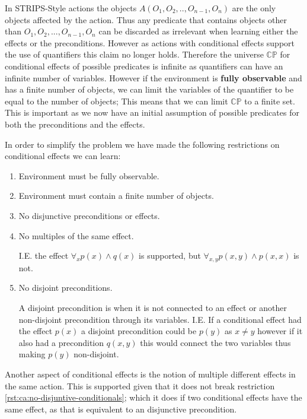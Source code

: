 \documentclass[../Master.tex]{subfiles}
\begin{document}
In STRIPS-Style actions the objects $A(O_1,O_2,..,O_{n-1},O_n)$ are the only objects affected by the action.
Thus any predicate that contains objects other than $O_1,O_2,...,O_{n-1},O_n$ can be discarded as irrelevant when learning either the effects or the preconditions.
However as actions with conditional effects support the use of quantifiers this claim no longer holds.
Therefore the universe $\mathbb{CP}$ for conditional effects of possible predicates is infinite as quantifiers can have an infinite number of variables.
However if the environment is \textbf{fully observable} and has a finite number of objects,
we can limit the variables of the quantifier to be equal to the number of objects; This means that we can limit $\mathbb{CP}$ to a finite set.
This is important as we now have an initial assumption of possible predicates for both the preconditions and the effects.

In order to simplify the problem we have made the following restrictions on conditional effects we can learn:
\begin{enumerate}
	\item Environment must be fully observable.
	\item Environment must contain a finite number of objects.
	\item \label{rst:ca:no-disjuntive-conditionals} No disjunctive preconditions or effects.
	\item \label{rst:ca:no-multiple-effect} No multiples of the same effect.

		  I.E. the effect $\forall_x p(x) \land q(x)$ is supported, but $\forall_{x, y} p(x, y) \land p(x, x) $ is not.

	\item \label{rst:ca:no-disjoint-preconditions} No disjoint preconditions.

		  A disjoint precondition is when it is not connected to an effect or another non-disjoint precondition through its variables.
		  I.E. If a conditional effect had the effect $p(x)$ a disjoint precondition could be $p(y)$ as $x \neq y$ however if it also had a precondition $q(x,y)$ this would connect the two variables thus making $p(y)$ non-disjoint.
\end{enumerate}

Another aspect of conditional effects is the notion of multiple different effects in the same action. This is supported given that it does not break restriction \ref{rst:ca:no-disjuntive-conditionals}; which it does if two conditional effects have the same effect, as that is equivalent to an disjunctive precondition.
\end{document}
